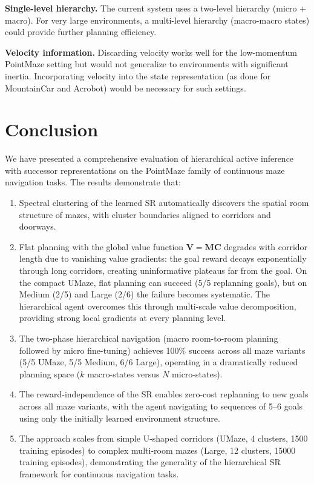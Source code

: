 \documentclass[11pt,a4paper]{article}
\newcommand{\M}{\mathbf{M}}
\newcommand{\C}{\mathbf{C}}
\newcommand{\V}{\mathbf{V}}
\begin{document}
\textbf{Single-level hierarchy.} The current system uses a two-level hierarchy (micro + macro). For very large environments, a multi-level hierarchy (macro-macro states) could provide further planning efficiency.

\textbf{Velocity information.} Discarding velocity works well for the low-momentum PointMaze setting but would not generalize to environments with significant inertia. Incorporating velocity into the state representation (as done for MountainCar and Acrobot) would be necessary for such settings.

\section{Conclusion}
\label{sec:conclusion}

We have presented a comprehensive evaluation of hierarchical active inference with successor representations on the PointMaze family of continuous maze navigation tasks.
The results demonstrate that:

\begin{enumerate}
    \item Spectral clustering of the learned SR automatically discovers the spatial room structure of mazes, with cluster boundaries aligned to corridors and doorways.

    \item Flat planning with the global value function $\V = \M\C$ degrades with corridor length due to vanishing value gradients: the goal reward decays exponentially through long corridors, creating uninformative plateaus far from the goal. On the compact UMaze, flat planning can succeed (5/5 replanning goals), but on Medium (2/5) and Large (2/6) the failure becomes systematic. The hierarchical agent overcomes this through multi-scale value decomposition, providing strong local gradients at every planning level.

    \item The two-phase hierarchical navigation (macro room-to-room planning followed by micro fine-tuning) achieves 100\% success across all maze variants (5/5 UMaze, 5/5 Medium, 6/6 Large), operating in a dramatically reduced planning space ($k$ macro-states versus $N$ micro-states).

    \item The reward-independence of the SR enables zero-cost replanning to new goals across all maze variants, with the agent navigating to sequences of 5--6 goals using only the initially learned environment structure.

    \item The approach scales from simple U-shaped corridors (UMaze, 4 clusters, 1500 training episodes) to complex multi-room mazes (Large, 12 clusters, 15000 training episodes), demonstrating the generality of the hierarchical SR framework for continuous navigation tasks.
\end{enumerate}
\end{document}
